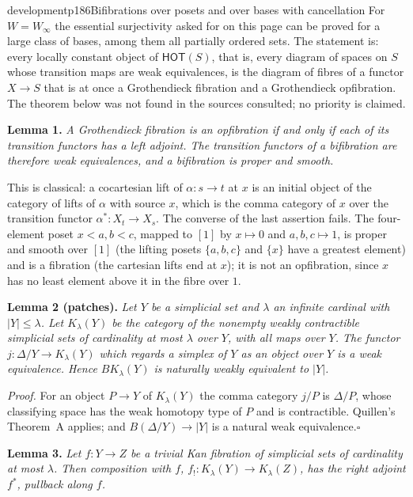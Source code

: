 \begin{dcomment}{development}{p186}{Bifibrations over posets and over bases with cancellation}
For $W=W_\infty$ the essential surjectivity asked for on this page can be proved for a large class of bases, among them all partially ordered sets. The statement is: every locally constant object of $\mathsf{HOT}(S)$, that is, every diagram of spaces on $S$ whose transition maps are weak equivalences, is the diagram of fibres of a functor $X\to S$ that is at once a Grothendieck fibration and a Grothendieck opfibration. The theorem below was not found in the sources consulted; no priority is claimed.

\textbf{Lemma 1.}
\textit{A Grothendieck fibration is an opfibration if and only if each of its transition functors has a left adjoint. The transition functors of a bifibration are therefore weak equivalences, and a bifibration is proper and smooth.}

This is classical: a cocartesian lift of $\alpha:s\to t$ at $x$ is an initial object of the category of lifts of $\alpha$ with source $x$, which is the comma category of $x$ over the transition functor $\alpha^*:X_t\to X_s$. The converse of the last assertion fails. The four-element poset $x<a,b<c$, mapped to $[1]$ by $x\mapsto0$ and $a,b,c\mapsto1$, is proper and smooth over $[1]$ (the lifting posets $\{a,b,c\}$ and $\{x\}$ have a greatest element) and is a fibration (the cartesian lifts end at $x$); it is not an opfibration, since $x$ has no least element above it in the fibre over $1$.

\textbf{Lemma 2 (patches).}
\textit{Let $Y$ be a simplicial set and $\lambda$ an infinite cardinal with $|Y|\leq\lambda$. Let $K_\lambda(Y)$ be the category of the nonempty weakly contractible simplicial sets of cardinality at most $\lambda$ over $Y$, with all maps over $Y$. The functor $j:\Delta/Y\to K_\lambda(Y)$ which regards a simplex of $Y$ as an object over $Y$ is a weak equivalence. Hence $BK_\lambda(Y)$ is naturally weakly equivalent to $|Y|$.}

\textit{Proof.}
For an object $P\to Y$ of $K_\lambda(Y)$ the comma category $j/P$ is $\Delta/P$, whose classifying space has the weak homotopy type of $P$ and is contractible. Quillen's Theorem~A applies; and $B(\Delta/Y)\to|Y|$ is a natural weak equivalence.\hfill$\square$

\textbf{Lemma 3.}
\textit{Let $f:Y\to Z$ be a trivial Kan fibration of simplicial sets of cardinality at most $\lambda$. Then composition with $f$, $f_!:K_\lambda(Y)\to K_\lambda(Z)$, has the right adjoint $f^*$, pullback along $f$.}


\end{dcomment}
